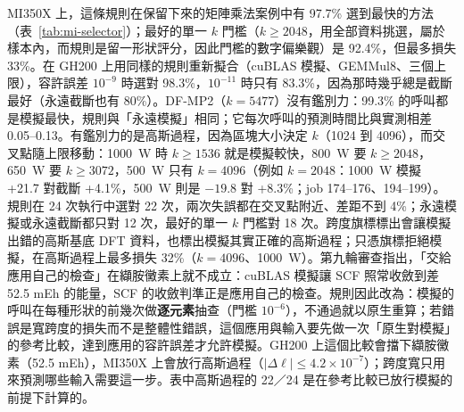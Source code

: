 MI350X 上，這條規則在保留下來的矩陣乘法案例中有 97.7\% 選到最快的方法（表~\ref{tab:mi-selector}）；最好的單一 $k$ 門檻（$k\ge2048$，用全部資料挑選，屬於樣本內，而規則是留一形狀評分，因此門檻的數字偏樂觀）是 92.4\%，但最多損失 33\%。在 GH200 上用同樣的規則重新擬合（cuBLAS 模擬、GEMMul8、三個上限），容許誤差 $10^{-9}$ 時選對 98.3\%，$10^{-11}$ 時只有 83.3\%，因為那時幾乎總是截斷最好（永遠截斷也有 80\%）。DF-MP2（$k=5477$）沒有鑑別力：99.3\% 的呼叫都是模擬最快，規則與「永遠模擬」相同；它每次呼叫的預測時間比與實測相差 0.05–0.13。有鑑別力的是高斯過程，因為區塊大小決定 $k$（1024 到 4096），而交叉點隨上限移動：1000~W 時 $k\ge1536$ 就是模擬較快，800~W 要 $k\ge2048$，650~W 要 $k\ge3072$，500~W 只有 $k=4096$（例如 $k=2048$：1000~W 模擬 +21.7 對截斷 +4.1\%，500~W 則是 $-19.8$ 對 +8.3\%；job 174–176、194–199）。規則在 24 次執行中選對 22 次，兩次失誤都在交叉點附近、差距不到 4\%；永遠模擬或永遠截斷都只對 12 次，最好的單一 $k$ 門檻對 18 次。跨度旗標標出會讓模擬出錯的高斯基底 DFT 資料，也標出模擬其實正確的高斯過程；只憑旗標拒絕模擬，在高斯過程上最多損失 32\%（$k=4096$、1000~W）。第九輪審查指出，「交給應用自己的檢查」在纈胺黴素上就不成立：cuBLAS 模擬讓 SCF 照常收斂到差 52.5 mEh 的能量，SCF 的收斂判準正是應用自己的檢查。規則因此改為：模擬的呼叫在每種形狀的前幾次做\textbf{逐元素}抽查（門檻 $10^{-6}$），不通過就以原生重算；若錯誤是寬跨度的損失而不是整體性錯誤，這個應用與輸入要先做一次「原生對模擬」的參考比較，達到應用的容許誤差才允許模擬。GH200 上這個比較會擋下纈胺黴素（52.5 mEh），MI350X 上會放行高斯過程（$|\Delta\ell|\le4.2\times10^{-7}$）；跨度寬只用來預測哪些輸入需要這一步。表中高斯過程的 22／24 是在參考比較已放行模擬的前提下計算的。

